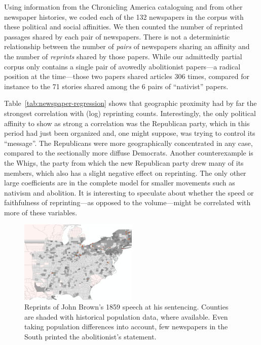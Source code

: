 \documentclass[pdftex,11pt]{article}
\begin{document}
Using information from the Chronicling America cataloguing and from
other newspaper histories, we coded each of the 132 newspapers in the
corpus with these political and social affinities.  We then counted
the number of reprinted passages shared by each pair of
newspapers.  There is not a deterministic relationship between the
number of \emph{pairs} of newspapers sharing an affinity and the
number of \emph{reprints} shared by those papers.  While our
admittedly partial corpus only contains a single pair of avowedly
abolitionist papers---a radical position at the time---those two
papers shared articles 306 times, compared for instance to the 71
stories shared among the 6 pairs of ``nativist'' papers.

Table~\ref{tab:newspaper-regression} shows that geographic proximity
had by far the strongest correlation with (log) reprinting counts.
Interestingly, the only political affinity to show as strong a
correlation was the Republican party, which in this period had just
been organized and, one might suppose, was trying to control its
``message''.  The Republicans were more geographically concentrated in
any case, compared to the sectionally more diffuse Democrats.  Another
counterexample is the Whigs, the party from which the new Republican
party drew many of its members, which also has a slight negative
effect on reprinting.  The only other large coefficients are in the
complete model for smaller movements such as nativism and abolition.
It is interesting to speculate about whether the speed or faithfulness
of reprinting---as opposed to the volume---might be correlated with
more of these variables.

\begin{figure}
  \centering
  \includegraphics[width=0.5\textwidth]{brown-speech}
  \caption{Reprints of John Brown's 1859 speech at his
    sentencing. Counties are shaded with historical population data,
    where available.  Even taking population differences into account,
    few newspapers in the South printed the abolitionist's statement.}
  \label{fig:brown-speech}
\end{figure}
\end{document}
